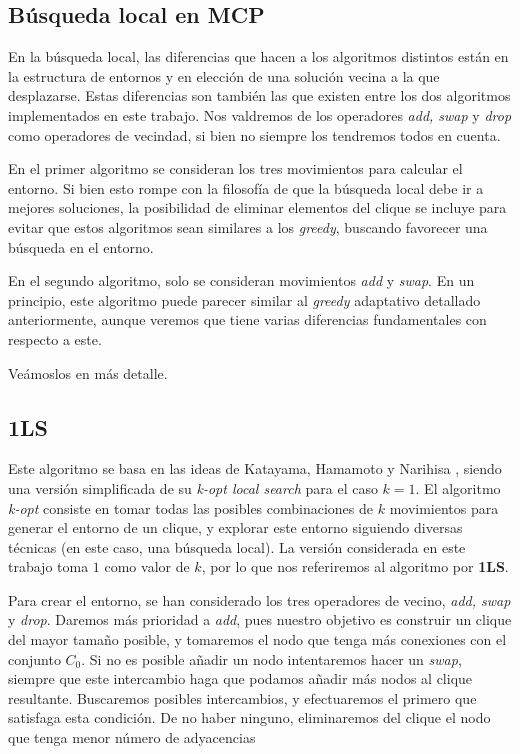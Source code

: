 \subsection{Búsqueda local en MCP}

En la búsqueda local, las diferencias que hacen a los algoritmos distintos están en la estructura
de entornos y en elección de una solución vecina a la que desplazarse. Estas diferencias son
también las que existen entre los dos algoritmos implementados en este trabajo. Nos valdremos
de los operadores \textit{add, swap} y \textit{drop} como operadores de vecindad, si bien no
siempre los tendremos todos en cuenta.

En el primer algoritmo se consideran los tres movimientos para calcular el entorno.
Si bien esto rompe con la filosofía de que la búsqueda local debe ir a mejores soluciones,
la posibilidad de eliminar elementos del clique se incluye para evitar que estos algoritmos
sean similares a los \textit{greedy}, buscando favorecer una búsqueda en el entorno.

En el segundo algoritmo, solo se consideran movimientos \textit{add} y \textit{swap}.
En un principio, este algoritmo puede parecer similar al \textit{greedy} adaptativo
detallado anteriormente, aunque veremos que tiene varias diferencias fundamentales
con respecto a este.

Veámoslos en más detalle.

\subsection{1LS}\label{1ls}

Este algoritmo se basa en las ideas de Katayama, Hamamoto y Narihisa \citep{katayama:2005},
siendo una versión simplificada de su \textit{k-opt local search} para el caso $k = 1$.
El algoritmo \textit{k-opt} consiste en tomar todas las posibles combinaciones de $k$
movimientos para generar el entorno de un clique, y explorar este entorno siguiendo
diversas técnicas (en este caso, una búsqueda local). La versión considerada en este
trabajo toma $1$ como valor de $k$, por lo que nos referiremos al algoritmo por \textbf{1LS}.

Para crear el entorno, se han considerado los tres operadores de vecino, \textit{add, swap}
y \textit{drop}. Daremos más prioridad a \textit{add}, pues nuestro objetivo es construir
un clique del mayor tamaño posible, y tomaremos el nodo que tenga más conexiones con el
conjunto $C_0$. Si no es posible añadir un nodo intentaremos hacer un \textit{swap}, siempre
que este intercambio haga que podamos añadir más nodos al clique resultante. Buscaremos
posibles intercambios, y efectuaremos el primero que satisfaga esta condición. De no haber
ninguno, eliminaremos del clique el nodo que tenga menor número de adyacencias

